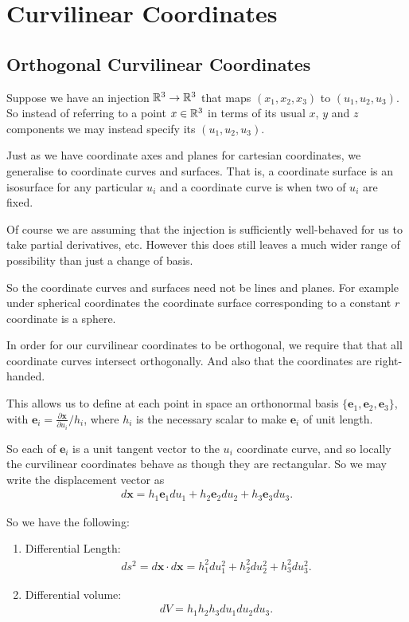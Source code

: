 \documentclass[]{article}
\begin{document}
\section{Curvilinear Coordinates}

\subsection{Orthogonal Curvilinear Coordinates}

Suppose we have an injection $\mathbb{R}^3 \to \mathbb{R}^3$ that maps $(x_1,x_2,x_3)$ to $(u_1,u_2,u_3)$. So instead of referring to a point $x \in \mathbb{R}^3$ in terms of its usual $x$, $y$ and $z$ components we may instead specify its $(u_1,u_2,u_3)$. 

Just as we have coordinate axes and planes for cartesian coordinates, we generalise to coordinate curves and surfaces. That is, a coordinate surface is an isosurface for any particular $u_i$ and a coordinate curve is when two of $u_i$ are fixed.

Of course we are assuming that the injection is sufficiently well-behaved for us to take partial derivatives, etc. However this does still leaves a much wider range of possibility than just a change of basis. 

So the coordinate curves and surfaces need not be lines and planes. For example under spherical coordinates the coordinate surface corresponding to a constant $r$ coordinate is a sphere.

In order for our curvilinear coordinates to be orthogonal, we require that that all coordinate curves intersect orthogonally. And also that the coordinates are right-handed.

This allows us to define at each point in space an orthonormal basis $\{\mathbf{e}_1, \mathbf{e}_2, \mathbf{e}_3\}$, with $\mathbf{e}_i = \frac{\partial \mathbf{x}}{\partial u_i} / h_i$, where $h_i$ is the necessary scalar to make $\mathbf{e}_i$ of unit length.

So each of $\mathbf{e}_i$ is a unit tangent vector to the $u_i$ coordinate curve, and so locally the curvilinear coordinates behave as though they are rectangular. So we may write the displacement vector as
\begin{align*}
		d\mathbf{x} = h_1 \mathbf{e}_1 du_1 + h_2 \mathbf{e}_2 du_2 + h_3 \mathbf{e}_3 du_3.
\end{align*}

So we have the following:
\begin{enumerate}
		\item Differential Length:
		\begin{align*}
			ds^2 = d\mathbf{x} \cdot d\mathbf{x} = h_1^2 du_1^2 + h_2^2 du_2^2 + h_3^2 du_3^2.		
		\end{align*}
\item Differential volume:
		\begin{align*}
				dV = h_1h_2h_3 du_1 du_2 du_3.
		\end{align*}
\end{enumerate}
\end{document}
